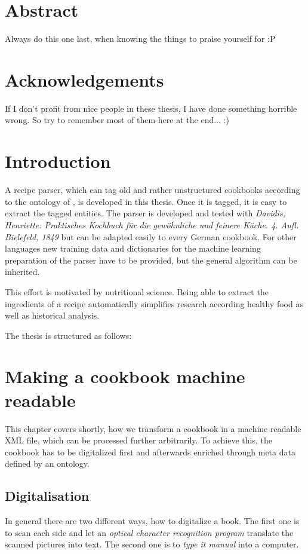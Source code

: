 \documentclass[12pt, twoside]{report}
\begin{document}
\chapter*{Abstract}
Always do this one last, when knowing the things to praise  yourself for :P

\chapter*{Acknowledgements}
If I don't profit from nice people in these thesis, I have done something horrible wrong. So try to remember most of them here at the end... :)

\tableofcontents

\listoffigures
\listoftables
\lstlistoflistings

\clearpage
{}  
\chapter{Introduction}
A recipe parser, which can tag old and rather unstructured cookbooks according to the ontology of \parencite{schemaRecipe}, is developed in this thesis. Once it is tagged, it is easy to extract the tagged entities. The parser is developed and tested with \textit{Davidis, Henriette: Praktisches Kochbuch für die gewöhnliche und feinere Küche. 4. Aufl. Bielefeld, 1849} but can be adapted easily to every German cookbook. For other languages new training data and dictionaries for the machine learning preparation of the parser have to be provided, but the general algorithm can be inherited.

This effort is motivated by nutritional science. Being able to extract the ingredients of a recipe automatically simplifies research according healthy food as well as historical analysis.

The thesis is structured as follows:


\chapter{Making a cookbook machine readable}
This chapter covers shortly, how we transform a cookbook in a machine readable XML file, which can be processed further arbitrarily. To achieve this, the cookbook has to be digitalized first and afterwards enriched through meta data defined by an ontology.

\section{Digitalisation}
In general there are two different ways, how to digitalize a book. The first one is to scan each side and let an \textit{optical character recognition program} translate the scanned pictures into text. The second one is to \textit{type it manual} into a computer.
\end{document}
